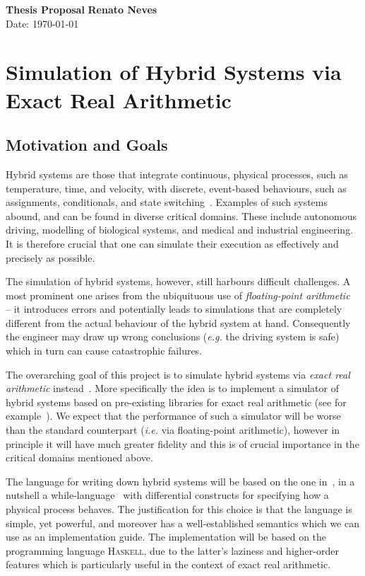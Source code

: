 \documentclass[a4paper, 11pt]{article}
\begin{document}
\noindent
\large\textbf{Thesis Proposal} \hfill \textbf{Renato Neves} \\
Date: \today

\section*{Simulation of Hybrid Systems via Exact Real Arithmetic}

\subsection*{Motivation and Goals}

Hybrid systems are those that integrate continuous, physical processes, such as
temperature, time, and velocity, with discrete, event-based behaviours, such as
assignments, conditionals, and state
switching~\cite{Platzer10,neves18,goncharov2020}. Examples of such systems
abound, and can be found in diverse critical domains. These
include autonomous driving, modelling of biological systems, and medical and
industrial engineering. It is therefore crucial that one can simulate their
execution as effectively and precisely as possible.

The simulation of hybrid systems, however, still harbours difficult challenges.
A most prominent one arises from the ubiquituous use of \emph{floating-point
arithmetic}~\cite{muller18} -- it introduces errors and potentially leads to
simulations that are completely different from the actual behaviour of the
hybrid system at hand. Consequently the engineer may draw up wrong conclusions
(\emph{e.g.} the driving system is safe) which in turn can cause catastrophic
failures.

The overarching goal of this project is to simulate hybrid systems via
\emph{exact real arithmetic}
instead~\cite{di93,di04,geuvers07,clarke12,bridger19}. More specifically the
idea is to implement a simulator of hybrid systems based on pre-existing
libraries for exact real arithmetic (see for example~\cite{konecny22}). We
expect that the performance of such a simulator will be worse than the standard
counterpart (\emph{i.e.} via floating-point arithmetic), however in principle
it will have much greater fidelity and this is of crucial importance in the
critical domains mentioned above. 

The language for writing down hybrid systems will be based on the one 
in~\cite{goncharov2020}, in a nutshell a while-language~\cite{winskel93} with differential
constructs for specifying how a physical process behaves. The justification for
this choice is that the language is simple, yet powerful, and moreover has a
well-established semantics which we can use as an implementation guide.
The implementation will be based on the programming language \textsc{Haskell},
due to the latter's laziness and higher-order features which is particularly
useful in the context of exact real arithmetic.
\end{document}
